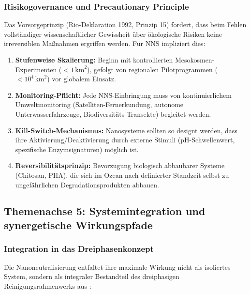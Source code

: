 ﻿\documentclass[12pt,a4paper]{article}
\theoremstyle{definition}
\theoremstyle{remark}
\begin{document}
\subsubsection{Risikogovernance und Precautionary Principle}

Das Vorsorgeprinzip (Rio-Deklaration 1992, Prinzip 15) fordert, dass beim
Fehlen vollständiger wissenschaftlicher Gewissheit über ökologische Risiken
keine irreversiblen Maßnahmen ergriffen werden. Für NNS impliziert dies:

\begin{enumerate}[label=\textbf{G\arabic*.}]
  \item \textbf{Stufenweise Skalierung:} Beginn mit kontrollierten Mesokosmen-
        Experimenten ($< 1\,\text{km}^2$), gefolgt von regionalen
        Pilotprogrammen ($< 10^4\,\text{km}^2$) vor globalem Einsatz.
  \item \textbf{Monitoring-Pflicht:} Jede NNS-Einbringung muss von
        kontinuierlichem Umweltmonitoring (Satelliten-Fernerkundung,
        autonome Unterwasserfahrzeuge, Biodiversitäts-Transekte) begleitet werden.
  \item \textbf{Kill-Switch-Mechanismus:} Nanosysteme sollten so designt werden,
        dass ihre Aktivierung/Deaktivierung durch externe Stimuli
        (pH-Schwellenwert, spezifische Enzymsignaturen) möglich ist.
  \item \textbf{Reversibilitätsprinzip:} Bevorzugung biologisch abbaubarer
        Systeme (Chitosan, PHA), die sich im Ozean nach definierter Standzeit
        selbst zu ungefährlichen Degradationsprodukten abbauen.
\end{enumerate}

\subsection{Themenachse 5: Systemintegration und synergetische Wirkungspfade}

\subsubsection{Integration in das Dreiphasenkonzept}

Die Nanoneutralisierung entfaltet ihre maximale Wirkung nicht als isoliertes System,
sondern als integraler Bestandteil des dreiphasigen Reinigungsrahmenwerks
aus \cite{cleanocn_epp2026}:
\end{document}
